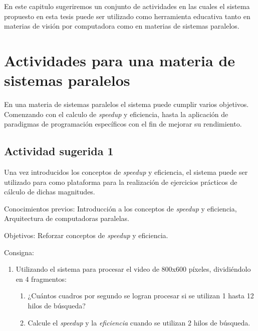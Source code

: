 
En este capitulo sugeriremos un conjunto de actividades en las cuales el sistema
propuesto en esta tesis puede ser utilizado como herramienta educativa tanto en
materias de visión por computadora como en materias de sistemas paralelos.

\section{Actividades para una materia de sistemas paralelos}

\label{eduparalelos}

En una materia de sistemas paralelos el sistema puede cumplir varios objetivos.
Comenzando con el calculo de \emph{speedup} y eficiencia, hasta la aplicación de
paradigmas de programación específicos con el fin de mejorar su rendimiento.

\subsection{Actividad sugerida 1}

Una vez introducidos los conceptos de \emph{speedup} y eficiencia, el sistema
puede ser utilizado para como plataforma para la realización de ejercicios
prácticos de cálculo de dichas magnitudes.

\begin{description}

	\item{Conocimientos previos}: Introducción a los conceptos de
		\emph{speedup} y eficiencia, Arquitectura de computadoras
		paralelas.

	\item{Objetivos}: Reforzar conceptos de \emph{speedup} y eficiencia.

	\item{Consigna}: \begin{enumerate}

	\item{Utilizando el sistema para procesar el video de 800x600 píxeles,
		dividiéndolo en 4 fragmentos:

\begin{enumerate}

	\item{¿Cuántos cuadros por segundo se logran procesar si se utilizan 1
		hasta 12 hilos de búsqueda?}

	\item{Calcule el \emph{speedup} y la \emph{eficiencia} cuando se
		utilizan 2 hilos de búsqueda.}

\end{enumerate}}

\end{enumerate}

\end{description}

